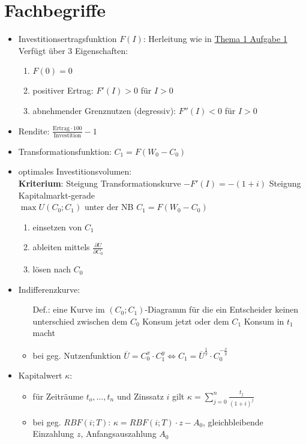 \documentclass[12pt]{article}
\begin{document}
	\section{Fachbegriffe}
	\begin{itemize}
		\item Investitionsertragsfunktion $F(I)$: Herleitung wie in \hyperref[Thema1Aufgabe1]{Thema 1 Aufgabe 1} \\
			Verfügt über 3 Eigenschaften: \begin{enumerate}
				\item $F(0)=0$
				\item positiver Ertrag: $F'(I) >0$ für $I>0$
				\item abnehmender Grenznutzen (degressiv): $F''(I) <0$ für $I>0$
			\end{enumerate}
		\item Rendite: $\frac{\text{Ertrag}\cdot100}{\text{Investition}}-1$\label{Rendite}
		\item Transformationsfunktion:  $C_1=F(W_0-C_0)$
		\item optimales Investitionsvolumen: \\
			\textbf{Kriterium}: Steigung Transformationskurve $-F'(I) = -(1+i)$ Steigung Kapitalmarkt-gerade\\
			$\max U(C_0;C_1)$ unter der NB $C_1=F(W_0-C_0)$
			\begin{enumerate}
				\item einsetzen von $C_1$
				\item ableiten mittels $\frac{\partial U}{\partial C_0}$
				\item lösen nach $C_0$
			\end{enumerate}
		\item Indifferenzkurve:
			\begin{itemize}
				\item[Def.:] eine Kurve im $(C_0;C_1)$-Diagramm für die ein Entscheider keinen unterschied zwischen dem $C_0$ Konsum jetzt oder dem $C_1$ Konsum in $t_1$ macht
				\item bei geg. Nutzenfunktion $\overline{U}=C_0^x\cdot C_1^y \Leftrightarrow C_1 = \overline{U}^{\frac{1}{y}}\cdot C_0^{-\frac{x}{y}} $
			\end{itemize}
		\item Kapitalwert $\kappa$: 
			\begin{itemize}
				\item für Zeiträume $t_o, \dots, t_n$ und Zinssatz $i$ gilt $\kappa=\sum_{j=0}^n \frac{t_j}{(1+i)^j}$ \label{Kapitalwert}
				\item bei geg. $RBF(i;T)$: $\kappa=RBF(i;T)\cdot z -A_0$, gleichbleibende Einzahlung $z$, Anfangsauszahlung $A_0$
			\end{itemize}
		

\end{itemize}
\end{document}
